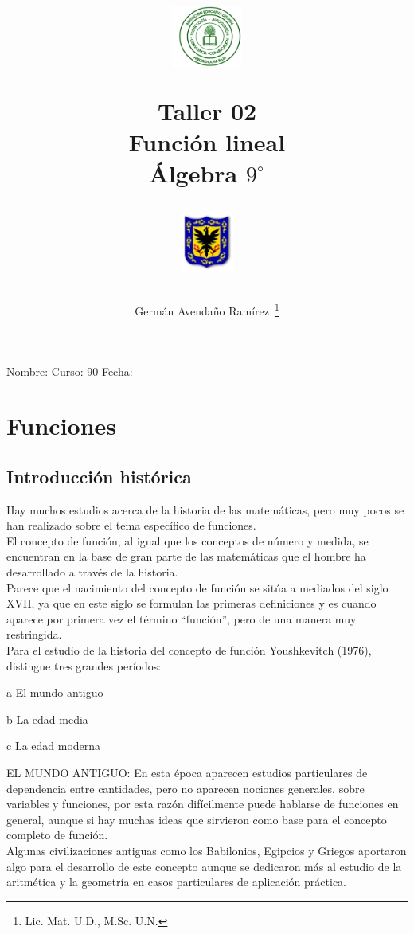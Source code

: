 \documentclass[10pt]{article}
\author{Germ\'an Avenda\~no Ram\'irez~\thanks{Lic. Mat. U.D., M.Sc. U.N.}}
\title{\begin{minipage}{0.15\textwidth}\includegraphics[height=2cm]{Images/logo-colegio.png}
\end{minipage}\hfill \begin{minipage}{0.7\textwidth}\begin{center}
Taller 02\\
Función lineal\\Álgebra $9^{\circ}$\end{center}
\end{minipage}\hfill
\begin{minipage}{0.15\textwidth}
\includegraphics[height=2cm]{Images/logo-sed.png} 
\end{minipage}}
\date{}
\begin{document}
\maketitle
Nombre: \hrulefill Curso: 90\underline{\hspace{12pt}}  Fecha: \underline{\hspace{2cm}}\\
\section*{Funciones}
\subsection*{Introducci\'{o}n hist\'{o}rica}
Hay muchos estudios acerca de la historia de las matemáticas, pero muy pocos se han realizado sobre el tema específico de funciones.\\

El concepto de función, al igual que los conceptos de número y medida, se encuentran en la base de gran parte de las matemáticas que el hombre ha desarrollado a través de la historia.\\

Parece que el nacimiento del concepto de función se sitúa a mediados del siglo XVII, ya que en este siglo se formulan las primeras definiciones y es cuando aparece por primera vez el término “función”, pero de una manera muy restringida.\\

Para el estudio de la historia del concepto de función Youshkevitch (1976), distingue tres grandes períodos:
\begin{enumerate}
\begin{multicols}{3}
\item[a] El mundo antiguo
\item[b] La edad media
\item[c] La edad moderna
\end{multicols}
\end{enumerate}
EL MUNDO ANTIGUO: En esta época aparecen estudios particulares de dependencia entre cantidades, pero no aparecen nociones generales, sobre variables y funciones, por esta razón difícilmente puede hablarse de funciones en general, aunque si hay muchas ideas que sirvieron como base para el concepto completo de función.\\

Algunas civilizaciones antiguas como los Babilonios, Egipcios y Griegos aportaron algo para el desarrollo de este concepto aunque se dedicaron más al estudio de la aritmética y la geometría en casos particulares de aplicación práctica.\\
\end{document}
